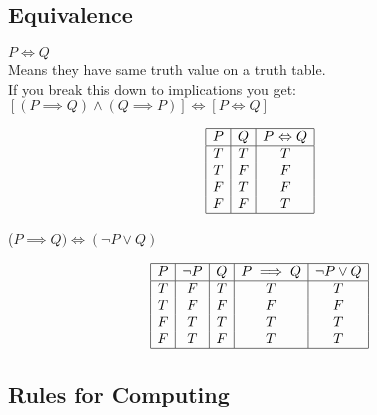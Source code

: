 \documentclass[a4paper]{article}
\begin{document}
\subsection{Equivalence}
$P \Leftrightarrow Q$	
\\
Means they have same truth value on a truth table.
\\
If you break this down to implications you get:
\\
$[(P \implies Q) \land (Q \implies P)] \Leftrightarrow [P \Leftrightarrow Q]$
\begin{center}
	\begin{displaymath}
		\begin{array}{|c|c|c|}
			\hline
			P & Q & P \Leftrightarrow Q \\ 
			\hline
			T & T & T\\
			T & F & F\\
			F & T & F\\
			F & F & T\\
			\hline
		\end{array}
	\end{displaymath}
\end{center}


($P \implies Q) \Leftrightarrow (\lnot P \lor Q)$ 
\begin{center}
	\begin{displaymath}
		\begin{array}{|c|c|c|c|c|}
			\hline
			P & \lnot P & Q & P \implies Q & \lnot P \lor Q\\ 
			\hline
			T & F & T & T & T\\
			T & F & F & F & F\\
			F & T & T & T & T\\
			F & T & F & T & T\\
			\hline
		\end{array}
	\end{displaymath}
\end{center}

\subsection{Rules for Computing}
\end{document}
